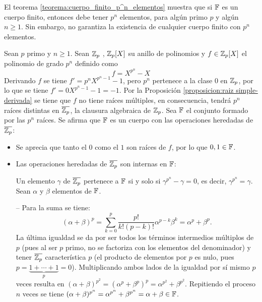 El teorema \ref{teorema:cuerpo_finito_p^n_elementos} muestra que si $\mathbb{F}$ es un cuerpo finito, entonces debe tener $p^n$ elementos, para algún primo $p$ y algún $n\geq1$. Sin embargo, no garantiza la existencia de cualquier cuerpo finito con $p^n$ elementos.

 
\begin{teorema}\label{teorema:existencia_cuerpo}\end{teorema}

\begin{dem}{\cite[p.~416]{GamboaAnillos}}
    Sean $p$ primo y $n\geq1$. Sean $\mathbb{Z}_p$ , $\mathbb{Z}_p[X]$ su anillo de polinomios y $f\in \mathbb{Z}_p[X]$ el polinomio de grado $p^n$ definido como \[f = X^{p^n}-X\]
    Derivando $f$ se tiene $f' = p^nX^{p^n-1}-1$, pero $p^n$ pertenece a la clase $0$ en $\mathbb{Z}_p$, por lo que se tiene $f' = 0X^{p^n-1}-1 = -1$. Por la Proposición \ref{proposicion:raiz simple-derivada} se tiene que $f$ no tiene raíces múltiples, en consecuencia, tendrá $p^n$ raíces distintas en $\overline{\mathbb{Z}_p}$, la clausura algebraica de $\mathbb{Z}_p$. Sea $\mathbb{F}$ el conjunto formado por las $p^n$ raíces. Se afirma que $\mathbb{F}$ es un cuerpo con las operaciones heredadas de $\overline{\mathbb{Z}_p}$: 
    \begin{itemize}
        \item Se aprecia que tanto el $0$ como el $1$ son raíces de $f$, por lo que $0,1\in \mathbb{F}$.
        \item Las operaciones heredadas de $\overline{\mathbb{Z}_p}$ son internas en $\mathbb{F}$:
        
        Un elemento $\gamma$ de $\overline{\mathbb{Z}_p}$ pertenece a $\mathbb{F}$ si y solo si $\gamma^{p^n} - \gamma = 0$, es decir, $\gamma^{p^n} = \gamma$. Sean $\alpha$ y $\beta$ elementos de $\mathbb{F}$.
        
        -- Para la suma se tiene:
        \[
        (\alpha + \beta)^p = \sum_{k=0}^p \frac{p!}{k!(p-k)!} \alpha^{p-k}\beta^k = \alpha^p + \beta^p.
        \]
        La última igualdad se da por ser todos los términos intermedios múltiplos de $p$ (pues al ser $p$ primo, no se factoriza con los elementos del denominador) y tener $\overline{\mathbb{Z}_p}$ característica $p$ (el producto de elementos por $p$ es nulo, pues $p =\underbrace{1 +  \cdots + 1}_{p} = 0$). Multiplicando ambos lados de la igualdad por sí mismo $p$ veces resulta en $(\alpha + \beta)^{p^2} = (\alpha^p + \beta^p)^p = \alpha^{p^2} + \beta^{p^2}$. Repitiendo el proceso $n$ veces se tiene $(\alpha + \beta)^{p^n} = \alpha^{p^n} + \beta^{p^n} = \alpha + \beta \in \mathbb{F}$.
        

\end{itemize}
\end{dem}
